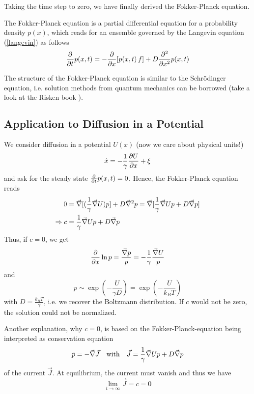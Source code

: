 \documentclass{notebook}
\begin{document}
Taking the time step to zero, we have finally derived the Fokker-Planck equation.
%
\begin{theorem}
	The Fokker-Planck equation is a partial differential equation for a probability density $p(x)$, which reads for an ensemble governed by the Langevin equation (\ref{langevin}) as follows
	\begin{equation}
	\pdv{t} p(x,t) = -\pdv{x}[p(x,t) \, f] + D \pdv[2]{x} p(x,t)
	\end{equation}
\end{theorem}
%
The structure of the Fokker-Planck equation is similar to the Schrödinger equation, i.e. solution methods from quantum mechanics can be borrowed (take a look at the Risken book \cite{Risken1996}). 


\subsection*{Application to Diffusion in a Potential}

We consider diffusion in a potential $U(x)$ (now we care about physical units!)
%
\begin{equation}
\dot{x} = - \frac{1}{\gamma} \pdv{U}{x} + \xi
\end{equation}
%
and ask for the steady state $\pdv{t} p(x,t) = 0$. Hence, the Fokker-Planck equation reads
%
\begin{align*}
	0 &= \vec{\nabla} [(\frac{1}{\gamma} \vec{\nabla} U) p] + D \vec{\nabla}^2 p 
	= \vec{\nabla} [\frac{1}{\gamma} \vec{\nabla} U p + D \vec{\nabla} p] \\
	\Rightarrow c &= \frac{1}{\gamma} \vec{\nabla} U p + D \vec{\nabla} p
\end{align*}
%
Thus, if $c = 0$, we get
%
\begin{equation}
\pdv{x} \ln p = \frac{\vec{\nabla} p}{p} = - \frac{1}{\gamma} \frac{\vec{\nabla} U}{p}
\end{equation}
%
and 
%
\begin{equation}
p \sim \exp(-\frac{U}{\gamma D}) = \exp(-\frac{U}{k_B T})
\end{equation}
%
with $D = \frac{k_B T}{\gamma}$, i.e. we recover the Boltzmann distribution. If $c$ would not be zero, the solution could not be normalized. 

Another explanation, why $c = 0$, is based on the Fokker-Planck-equation being interpreted as conservation equation 
%
\begin{equation}
\dot{p} = - \vec{\nabla} \vec{J} \quad \mathrm{with} \quad \vec{J} = \frac{1}{\gamma} \vec{\nabla} U p + D \vec{\nabla} p
\end{equation}
%
of the current $\vec{J}$. At equilibrium, the current must vanish and thus we have
%
\begin{equation}
\lim_{t \to \infty} \vec{J} = c = 0
\end{equation}
%
\end{document}
